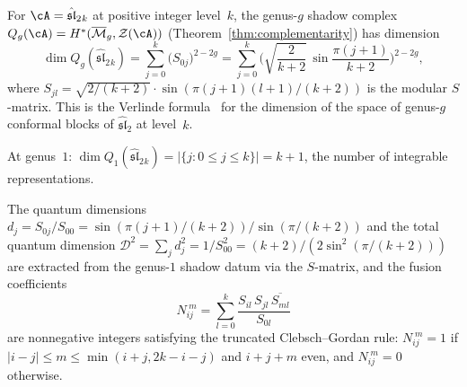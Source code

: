 \begin{proposition}
\label{prop:verlinde-from-shadow}
For $\cA = \hat{\mathfrak{sl}}_2{}_k$ at positive integer level~$k$,
the genus-$g$ shadow complex
$Q_g(\cA) = H^*(\overline{\mathcal{M}}_{g}, \mathcal{Z}(\cA))$
\textup{(}Theorem~\textup{\ref{thm:complementarity})} has dimension
\begin{equation}\label{eq:verlinde-from-shadow}
\dim Q_g(\hat{\mathfrak{sl}}_2{}_k)
= \sum_{j=0}^{k}
 \bigl(S_{0j}\bigr)^{2-2g}
= \sum_{j=0}^{k}
 \biggl(
 \sqrt{\frac{2}{k+2}}\,
 \sin\frac{\pi(j+1)}{k+2}
 \biggr)^{\!2-2g},
\end{equation}
where $S_{jl} = \sqrt{2/(k+2)} \cdot \sin(\pi(j+1)(l+1)/(k+2))$ is
the modular $S$-matrix. This is the Verlinde
formula~\cite{Verlinde} for the dimension of the space of genus-$g$
conformal blocks of $\hat{\mathfrak{sl}}_2$ at level~$k$.

At genus~$1$:
$\dim Q_1(\hat{\mathfrak{sl}}_2{}_k)
= |\{j : 0 \le j \le k\}| = k + 1$,
the number of integrable representations.

The quantum dimensions
$d_j = S_{0j}/S_{00} = \sin(\pi(j+1)/(k+2))/\sin(\pi/(k+2))$
and the total quantum dimension
$\mathcal{D}^2 = \sum_j d_j^2 = 1/S_{00}^2
= (k+2)/(2\sin^2(\pi/(k+2)))$
are extracted from the genus-$1$ shadow datum via the $S$-matrix,
and the fusion coefficients
\begin{equation}\label{eq:verlinde-fusion}
N_{ij}^{\;m}
= \sum_{l=0}^{k}
 \frac{S_{il}\, S_{jl}\, \overline{S_{ml}}}{S_{0l}}
\end{equation}
are nonnegative integers satisfying the truncated
Clebsch--Gordan rule: $N_{ij}^{\;m} = 1$ if
$|i-j| \le m \le \min(i+j, 2k-i-j)$ and $i+j+m$ even, and
$N_{ij}^{\;m} = 0$ otherwise.
\end{proposition}

